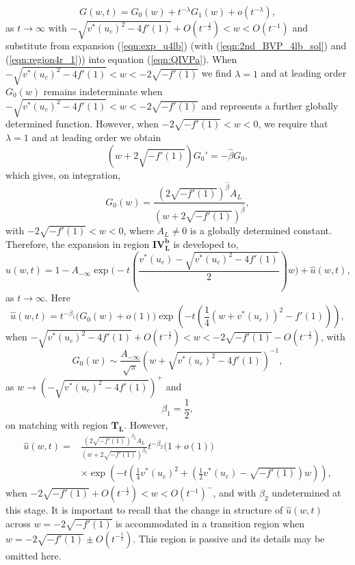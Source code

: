 \documentclass[11pt,a4paper]{article}
\newcommand{\eeref}[1]{(\ref{eqn:#1})}
\newcommand{\eelab}[1]{\label{eqn:#1}}
\def\beq{\begin{equation}}
\def\eeq{\end{equation}}
\begin{document}
\beq \eelab{region4r_1}
G(w,t) = G_0(w) + t^{-\lambda} G_1(w) + o \left( t^{- \lambda} \right),
\eeq
as $t \to \infty$ with $-  \sqrt{v^*(u_c)^2 -  4 f'(1)} + O(t^{-\frac{1}{2}}) < w <O(t^{-1})$ and substitute from expansion \eeref{exp_u4lb} (with \eeref{2nd_BVP_4lb_sol} and \eeref{region4r_1}) into equation \eeref{QIVPa}. When $ -  \sqrt{v^*(u_c)^2 -  4 f'(1)} < w < -2 \sqrt{-f'(1)}$ we find $\lambda=1$ and   at leading order 
%
 $G_0(w)$ remains indeterminate when $ -  \sqrt{v^*(u_c)^2 -  4 f'(1)}  < w < -2 \sqrt{-f'(1)} $ and represents a further globally determined function. However, when $-2 \sqrt{-f'(1)} < w < 0$, we require that $\lambda=1$ and  at leading order we obtain 
\beq
\left( w + 2 \sqrt{- f'(1)} \right) G_0'  = - \hat{\beta} G_0 ,
\eeq
which gives, on integration, 
\beq
G_0(w) = \frac{ \left( 2 \sqrt{- f'(1)} \right)^{\hat{\beta}} A_L}{ \left( w + 2 \sqrt{-f'(1)} \right)^{\hat{\beta}}} ,
\eeq 
with $-2 \sqrt{-f'(1)} < w <  0$, where $A_L \neq 0$ is a globally determined constant. Therefore, the expansion in region $\mathbf{IV_L^b}$ is developed to,
\beq
u(w,t) =  1 - A_{-\infty} \exp \Bigg( -t \left( \frac{v^*(u_c) - \sqrt{v^*(u_c)^2 - 4f'(1)}}{2} \right) w  \Bigg) + \hat{u}(w,t) , \eelab{exp_u_4lb_full} 
\eeq
as $t \to \infty$. Here  
\beq
\hat{u}(w,t) = t^{- \beta_1} \big( G_0(w)+o(1) \big) \exp { \left( -t \left( \frac{1}{4} \left( w + v^*(u_c) \right)^2 - f'(1) \right) \right) },
\eeq
when $ -  \sqrt{v^*(u_c)^2 -  4 f'(1)} + O(t^{-\frac{1}{2}}) < w < -2 \sqrt{-f'(1)}  - O(t^{-\frac{1}{2}}) $, with
\beq
G_0(w) \sim \frac{A_{-\infty}}{\sqrt{\pi}} \left( w + \sqrt{v^*(u_c)^2 -  4 f'(1)} \right)^{-1},
\eeq
as $w \to ( -  \sqrt{v^*(u_c)^2 -  4 f'(1)} )^+$ and 
\beq
\beta_1 = \frac{1}{2},
\eeq
on matching with region $\mathbf{T_L}$. However,
 \begin{align} 
\hat{u}(w,t) = & \frac{ \left( 2 \sqrt{- f'(1)} \right)^{\beta_2} A_L}{ \left( w + 2 \sqrt{-f'(1)} \right)^{\beta_2}}  t^{- \beta_2} \big( 1 + o(1) \big) \nonumber \\
& \times \exp { \left( -t \left( \frac{1}{4}v^*(u_c)^2 + \left( \frac{1}{2}v^*(u_c) - \sqrt{- f'(1)} \right) w \right) \right) },
\end{align} 
when $-2 \sqrt{-f'(1)} + O(t^{-\frac{1}{2}}) < w <  O(t^{-1})^-$, and with $\beta_2$ undetermined at this stage. It is important to recall that the change in structure of $\hat{u}(w,t)$ across $w= -2 \sqrt{-f'(1)}$ is accommodated in a transition region when $w=-2 \sqrt{-f'(1)} \pm O(t^{- \frac{1}{2}})$. This region is passive and its details may be omitted here. 
\end{document}
